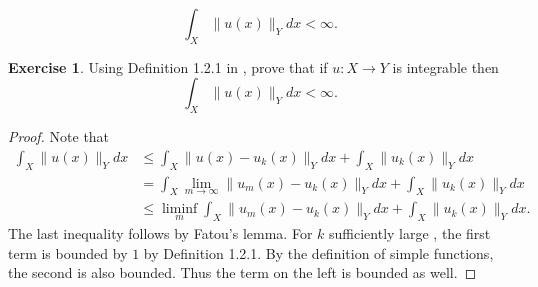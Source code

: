 \documentclass{amsart}
\theoremstyle{plain}
\theoremstyle{definition}
\newtheorem{exer}{Exercise}[section]
\begin{document}
$$\int_{X} \|u(x)\|_{Y} dx < \infty.$$
\begin{exer}
   Using Definition 1.2.1 in \cite{lord2014introduction}, prove that if $u:X\to Y$ is integrable then 
        $$\int_{X} \|u(x)\|_{Y} dx < \infty.$$
\end{exer}
\begin{proof}
    Note that 
    \begin{align*}
        \int_{X} \|u(x)\|_{Y} dx &\leq \int_{X} \|u(x)-u_k(x)\|_{Y} dx + \int_{X} \|u_k(x)\|_{Y} dx \\
        & = \int_{X} \lim_{m\to \infty} \|u_m(x)-u_k(x)\|_{Y} dx + \int_{X} \|u_k(x)\|_{Y} dx \\
        & \leq \liminf_{m}\int_{X} \|u_m(x)-u_k(x)\|_{Y} dx+ \int_{X} \|u_k(x)\|_{Y} dx.
    \end{align*}
    The last inequality follows by Fatou's lemma. 
    For $k$ sufficiently large , the first term is bounded by $1$ by Definition 1.2.1. By the definition of simple functions, the second is also bounded. Thus the term on the left is bounded as well.
\end{proof}
\end{document}
